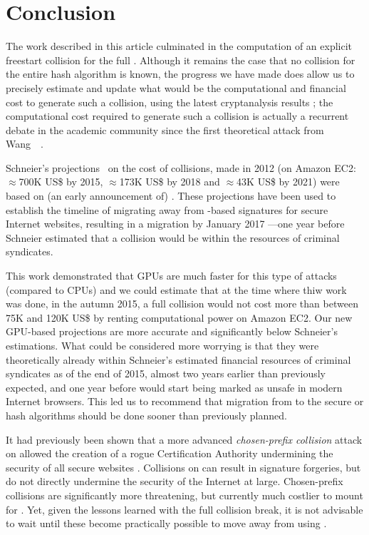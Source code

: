 \section{Conclusion}
\label{sec:conclusion}

The work described in this article culminated in the computation of an explicit freestart collision for the full \shaone. Although it remains the case that no collision for the entire hash algorithm is known,
the progress we have made does allow us to precisely estimate and update what would be the computational and financial cost to generate such a collision, using the latest cryptanalysis results \cite{DBLP:conf/eurocrypt/Stevens13};
the computational cost required to generate such a collision is actually a recurrent debate in the academic community since the first theoretical attack from Wang~\etal~\cite{DBLP:conf/crypto/WangYY05a}.

Schneier's projections~\cite{schneierSHA1} on the cost of \shaone collisions, made in 2012 (on Amazon EC2: $\approx$700K US\$ by 2015, $\approx$173K US\$ by 2018 and $\approx$43K US\$ by 2021) were based on
(an early announcement of) \cite{DBLP:conf/eurocrypt/Stevens13}. These projections have been used to establish the timeline of migrating away from \shaone-based signatures for secure Internet websites,
resulting in a migration by January 2017 ---one year before Schneier estimated that a \shaone collision would be within the resources of criminal syndicates. 

This work demonstrated that GPUs are much faster for this type of attacks (compared to CPUs)
and we could estimate that at the time where thiw work was done, in the autumn 2015, a full \shaone collision would not cost more than between 75K and 120K US\$ by renting computational power on Amazon EC2.
Our new GPU-based projections are more accurate and significantly below Schneier's estimations. What could be considered more worrying
is that they were theoretically already within Schneier's estimated financial resources of criminal syndicates as of the end of 2015,
almost two years earlier than previously expected, and one year before \shaone would start being marked as unsafe in modern Internet browsers.
This led us to recommend that migration from \shaone to the secure \shatwo or \shathree hash algorithms should be done sooner than previously planned.

It had previously been shown that a more advanced \emph{chosen-prefix collision} attack on \mdfive allowed the creation of a rogue Certification Authority undermining the security of all secure websites \cite{DBLP:conf/crypto/StevensSALMOW09}. 
Collisions on \shaone can result in \eg{} signature forgeries, but do not directly undermine the security of the Internet at large. Chosen-prefix collisions
are significantly more threatening, but currently much costlier to mount for \shaone. Yet, given the lessons learned with the \mdfive full collision break, it is not advisable to wait until these become practically possible
to move away from using \shaone.

